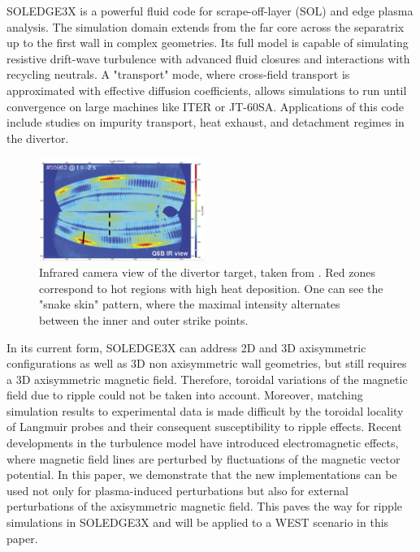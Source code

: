 SOLEDGE3X is a powerful fluid code for scrape-off-layer (SOL) and edge plasma analysis. The simulation domain extends from the far core across the separatrix up to the first wall in complex geometries. Its full model is capable of simulating resistive drift-wave turbulence\cite{bufferand2017} with advanced fluid closures\cite{bufferand2022implementation} and interactions with recycling neutrals\cite{quadri2024}. A "transport" mode, where cross-field transport is approximated with effective diffusion coefficients, allows simulations to run until convergence on large machines like ITER\cite{rivals2022soledge3x} or JT-60SA\cite{deGianni2024}. Applications of this code include studies on impurity transport\cite{Ciraolo2021}, heat exhaust\cite{rivals2022impact}, and detachment regimes in the divertor\cite{yang2023control}. \newline


\begin{figure}[H]\centering
	\centering
	\includegraphics[width=0.48\textwidth]{schemes/IR_WEST_ripple.jpg}
	\caption{Infrared camera view of the divertor target, taken from \cite{bucalossi2022}. Red zones correspond to hot regions with high heat deposition. One can see the "snake skin" pattern, where the maximal intensity alternates between the inner and outer strike points.}
	\label{fig:IR_WEST}
\end{figure}

In its current form, SOLEDGE3X can address 2D and 3D axisymmetric configurations as well as 3D non axisymmetric wall geometries\cite{diGenova2023thesis}, but still requires a 3D axisymmetric magnetic field. Therefore, toroidal variations of the magnetic field due to ripple could not be taken into account. Moreover, matching simulation results to experimental data is made difficult by the toroidal locality of Langmuir probes and their consequent susceptibility to ripple effects. Recent developments in the turbulence model have introduced electromagnetic effects\cite{dull2024introducing}, where magnetic field lines are perturbed by fluctuations of the magnetic vector potential. In this paper, we demonstrate that the new implementations can be used not only for plasma-induced perturbations but also for external perturbations of the axisymmetric magnetic field. This paves the way for ripple simulations in SOLEDGE3X and will be applied to a WEST scenario in this paper. 

